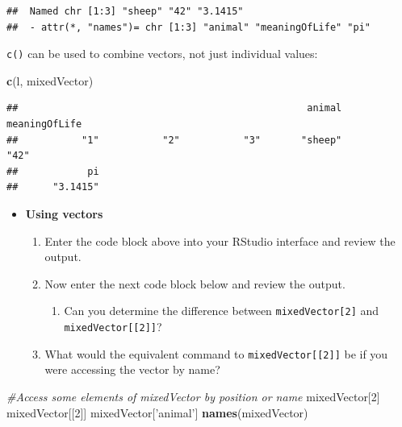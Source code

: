 \documentclass[a4paper]{book}
\newenvironment{Shaded}{\begin{snugshade}}{\end{snugshade}}
\newcommand{\KeywordTok}[1]{\textcolor[rgb]{0.13,0.29,0.53}{\textbf{{#1}}}}
\newcommand{\DecValTok}[1]{\textcolor[rgb]{0.00,0.00,0.81}{{#1}}}
\newcommand{\StringTok}[1]{\textcolor[rgb]{0.31,0.60,0.02}{{#1}}}
\newcommand{\CommentTok}[1]{\textcolor[rgb]{0.56,0.35,0.01}{\textit{{#1}}}}
\newcommand{\NormalTok}[1]{{#1}}
\providecommand{\tightlist}{%
  \setlength{\itemsep}{0pt}\setlength{\parskip}{0pt}}
\renewenvironment{Shaded}
{\vspace{1.5em}\begin{leftbar}\begin{snugshade}}
{\end{snugshade}\end{leftbar}\vspace{3pt}}
\newenvironment{rmdblock}[1]
  {\vspace{1.5em}\begin{shaded*}
  \begin{itemize}
  \renewcommand{\labelitemi}{
    \raisebox{-.7\height}[0pt][0pt]{
      {\setkeys{Gin}{width=3em,keepaspectratio}\texttt{[image: images/\#1]}}
    }
  }
  \item
  }
  {
  \end{itemize}
  \end{shaded*}
  }
\newenvironment{rmdexercise}
  {\begin{rmdblock}{exercise}}
  {\end{rmdblock}}
\begin{document}
\begin{verbatim}
##  Named chr [1:3] "sheep" "42" "3.1415"
##  - attr(*, "names")= chr [1:3] "animal" "meaningOfLife" "pi"
\end{verbatim}

\texttt{c()} can be used to combine vectors, not just individual values:

\begin{Shaded}
\begin{Highlighting}[]
\KeywordTok{c}\NormalTok{(l, mixedVector)}
\end{Highlighting}
\end{Shaded}

\begin{verbatim}
##                                                  animal meaningOfLife 
##           "1"           "2"           "3"       "sheep"          "42" 
##            pi 
##      "3.1415"
\end{verbatim}

\begin{rmdexercise}
\textbf{Using vectors}

\begin{enumerate}
\def\labelenumi{\arabic{enumi}.}
\item
  Enter the code block above into your RStudio interface and review the
  output.
\item
  Now enter the next code block below and review the output.

  \begin{enumerate}
  \def\labelenumii{\alph{enumii})}
  \tightlist
  \item
    Can you determine the difference between \texttt{mixedVector{[}2{]}}
    and \texttt{mixedVector{[}{[}2{]}{]}}?
  \end{enumerate}
\item
  What would the equivalent command to \texttt{mixedVector{[}{[}2{]}{]}}
  be if you were accessing the vector by name?
\end{enumerate}
\end{rmdexercise}

\begin{Shaded}
\begin{Highlighting}[]
\CommentTok{#Access some elements of mixedVector by position or name}
\NormalTok{mixedVector[}\DecValTok{2}\NormalTok{]}
\NormalTok{mixedVector[[}\DecValTok{2}\NormalTok{]]}
\NormalTok{mixedVector[}\StringTok{'animal'}\NormalTok{]}
\KeywordTok{names}\NormalTok{(mixedVector)}
\end{Highlighting}
\end{Shaded}
\end{document}
